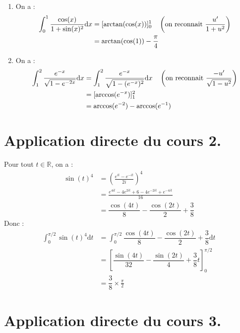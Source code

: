 \documentclass[french,11pt,twoside]{VcCours}
\newcommand{\dx}{\text{d}x}
\newcommand{\dt}{\text{d}t}
\begin{document}
\begin{enumerate}
\item On a :
\begin{align*}
\int_{0}^1 \dfrac{\cos(x)}{1+\sin(x)^2} \dx & = [\arctan(\cos(x))]_{0}^{1} \quad \left(\hbox{on reconnait } \frac{u'}{1+u^2} \right) \\
& = \arctan(\cos(1))- \dfrac{\pi}{4} 
\end{align*}
\item On a :
\begin{align*}
\int_{1}^{2} \dfrac{e^{-x}}{\sqrt{1-e^{-2x}}} \dx & = \int_{1}^{2} \dfrac{e^{-x}}{\sqrt{1-(e^{-x})^2}} \dx \quad \left(\hbox{on reconnait } \frac{-u'}{\sqrt{1-u^2}} \right) \\
& = [\textrm{arccos}(e^{-x})]_{1}^{2} \\
& = \textrm{arccos}(e^{-2})-\textrm{arccos}(e^{-1})
\end{align*}
\end{enumerate}


\medskip

\section*{Application directe du cours 2.}

Pour tout $t \in \mathbb{R}$, on a :
\begin{align*}
\sin(t)^4 & = \left( \frac{e^{it}-e^{-it}}{2i} \right)^4 \\
& = \frac{e^{4it}-4e^{2it}+6-4e^{-2it}+e^{-4it}}{16} \\
& = \dfrac{\cos(4t)}{8} - \dfrac{\cos(2t)}{2} +\dfrac{3}{8} 
\end{align*}
Donc :
\begin{align*}
 \int_{0}^{\pi/2} \sin(t)^4 \dt& = \int_{0}^{\pi/2} \dfrac{\cos(4t)}{8} - \dfrac{\cos(2t)}{2} +\dfrac{3}{8}  \dt \\
 & = \left[ \dfrac{\sin(4t)}{32} - \dfrac{\sin(2t)}{4} + \dfrac{3}{8}t \right]_{0}^{\pi/2} \\
 & = \dfrac{3}{8} \times \frac{\pi}{2} 
\end{align*}

\medskip

\section*{Application directe du cours 3.}
\end{document}
